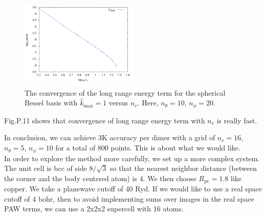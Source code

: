 \documentclass[paper=a4, fontsize=11pt]{article} %
\numberwithin{equation}{section} %
\numberwithin{figure}{section} %
\numberwithin{table}{section} %
\newcommand{\Rpc}{{R_{\mathrm{pc}}}}
\begin{document}
\begin{figure}[h!] 
    \centering
    \includegraphics[width=0.5\textwidth]{nrElong}
    \caption{The convergence of the long range energy term for the spherical Bessel basis with $\hat {k}_{\mathrm{max}} = 1$ versus $n_r$. Here, $n_{\theta} = 10$, $n_{\phi} = 20$.} 
    \label{fig:nrElong}
\end{figure}
Fig.P.11 shows that convergence of long range energy term with $n_r$ is really fast.

In conclusion, we can achieve 3K accuracy per dimer with a grid of $n_r = 16$, $n_{\theta} = 5$, $n_{\phi} = 10$ for a total of 800 points. This is about what we would like.\\

In order to explore the method more carefully, we set up a more complex system. The unit cell is bcc of side $8/\sqrt{3}$ so that the nearest neighbor distance (between the corner and the body centered atom) is 4. We then choose $\Rpc = 1.8$ like copper. We take a planewave cutoff of 40 Ryd. If we would like to use a real space cutoff of 4 bohr, then to avoid implementing sums over images in the real space PAW terms, we can use a 2x2x2 supercell with 16 atoms.

 
\end{document}
